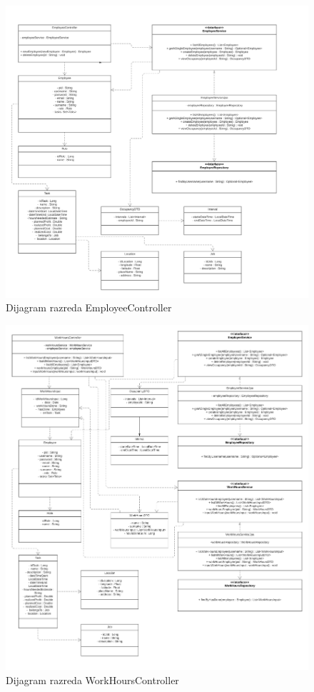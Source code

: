 			
			\eject
			\begin{figure}[H]
					\centering
					\includegraphics[width=\textwidth]{slike/Dijagram razreda - EmployeeController.jpg}
					\caption{Dijagram razreda EmployeeController}
				\end{figure}
			
			
			\eject
			\begin{figure}[H]
					\centering
					\includegraphics[width=\textwidth]{slike/Dijagram razreda - WorkHoursController.jpg}
					\caption{Dijagram razreda WorkHoursController}
				\end{figure}
			
